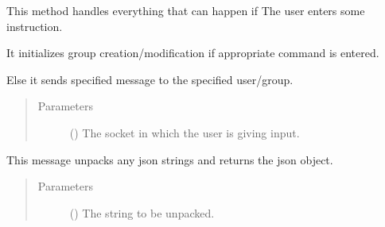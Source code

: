\documentclass[letterpaper,10pt,english]{sphinxmanual}
\begin{document}
\begin{fulllineitems}
\begin{fulllineitems}
\end{fulllineitems}


\begin{fulllineitems}
\label{\detokenize{clientHelper:clientHelper.Client.sendMessage}}
This method handles everything that can happen if The user enters some instruction.

It initializes group creation/modification if appropriate command is entered.

Else it sends specified message to the specified user/group.
\begin{quote}\begin{description}
\item[{Parameters}] \leavevmode
{} () \textendash{} The socket in which the user is giving input.

\end{description}\end{quote}

\end{fulllineitems}


\begin{fulllineitems}
\label{\detokenize{clientHelper:clientHelper.Client.unpackJSON}}
This message unpacks any json strings and returns the json object.
\begin{quote}\begin{description}
\item[{Parameters}] \leavevmode
{} () \textendash{} The string to be unpacked.

\end{description}\end{quote}

\end{fulllineitems}


\end{fulllineitems}
\end{document}
